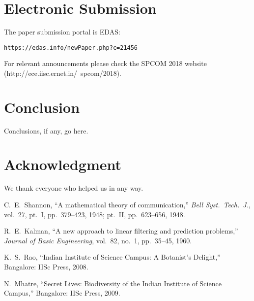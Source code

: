 \documentclass[10pt,conference]{IEEEtran}
\begin{document}
\section{Electronic Submission}
The paper submission portal is EDAS:
\begin{center}
\texttt{https://edas.info/newPaper.php?c=21456}
\end{center}
For relevant announcements please check the SPCOM 2018 website
(http://ece.iisc.ernet.in/~spcom/2018).

\section{Conclusion}
Conclusions, if any, go here.


\section*{Acknowledgment}
We thank everyone who helped us in any way. 

\begin{thebibliography}{1}

C.~E.~Shannon, ``A mathematical theory of communication,''
\emph{Bell Syst.\ Tech.\ J.}, vol.\ 27, pt.~I, pp.~379--423, 1948;
     pt.~II, pp.~623--656, 1948.

R.~E.~Kalman, ``A new approach to linear filtering and prediction
problems,'' \emph{Journal of Basic Engineering}, vol.\ 82, no.\ 1,
pp.~35--45, 1960.

K.~S.~Rao, ``Indian Institute of Science Campus: A Botanist's
Delight,'' Bangalore: IISc Press, 2008.

N.~Mhatre, ``Secret Lives: Biodiversity of the Indian Institute of
Science Campus,'' Bangalore: IISc Press, 2009.

\end{thebibliography}
\end{document}
